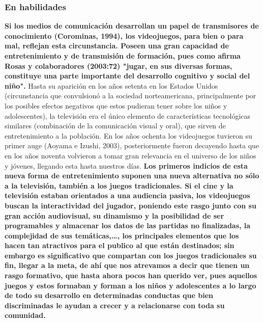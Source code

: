 \documentclass{bmcart}
\begin{document}
\subsubsection*{En habilidades}
\textbf{Si los medios de comunicación desarrollan un papel de transmisores de conocimiento (Corominas, 1994), los videojuegos, para bien o para mal, reflejan esta circunstancia. Poseen una gran capacidad de entretenimiento y de transmisión de formación, pues como afirma Rosas y colaboradores (2003:72) "jugar, en sus diversas formas, constituye una parte importante del desarrollo cognitivo y social del niño".}
\newline
\newline
Hasta su aparición en los años setenta en los Estados Unidos (circunstancia que convulsionó a la sociedad norteamericana, principalmente por los posibles efectos negativos que estos pudieran tener sobre los niños y adolescentes), la televisión era el único elemento de características tecnológicas similares (combinación de la comunicación visual y oral), que sirven de entretenimiento a la población. En los años ochenta los videojuegos tuvieron su primer auge (Aoyama e Izushi, 2003), posteriormente fueron decayendo hasta que en los años noventa volvieron a tomar gran relevancia en el universo de los niños y jóvenes, llegando esta hasta nuestros días.
\newline
\newline
\textbf {Los primeros indicios de esta nueva forma de entretenimiento suponen una nueva alternativa no sólo a la televisión, también a los juegos tradicionales. Si el cine y la televisión estaban orientados a una audiencia pasiva, los videojuegos buscan la interactividad del jugador, poniendo este rasgo junto con su gran acción audiovisual, su dinamismo y la posibilidad de ser programables y almacenar los datos de las partidas no finalizadas, la complejidad de sus temáticas,…, los principales elementos que los hacen tan atractivos para el publico al que están destinados; sin embargo es significativo que compartan con los juegos tradicionales su fin, llegar a la meta, de ahí que nos atrevamos a decir que tienen un rasgo formativo, que hasta ahora pocos han querido ver, pues aquellos juegos y estos formaban y forman a los niños y adolescentes a lo largo de todo su desarrollo en determinadas conductas que bien discriminadas le ayudan a crecer y a relacionarse con toda su comunidad.}
\newline
\newline
\end{document}
